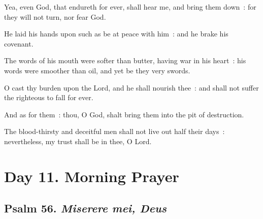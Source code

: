 Yea, even God, that endureth for ever, shall hear me, and bring them down~: for they will not turn, nor fear God.\par
{}He laid his hands upon such as be at peace with him~: and he brake his covenant.\par
{}The words of his mouth were softer than butter, having war in his heart~: his words were smoother than oil, and yet be they very swords.\par
{}O cast thy burden upon the Lord, and he shall nourish thee~: and shall not suffer the righteous to fall for ever.\par
{}And as for them~: thou, O God, shalt bring them into the pit of destruction.\par
{}The blood-thirsty and deceitful men shall not live out half their days~: nevertheless, my trust shall be in thee, O Lord.\par

\section*{Day 11. Morning Prayer}

\subsection{Psalm 56. \textit{Miserere mei, Deus}}

